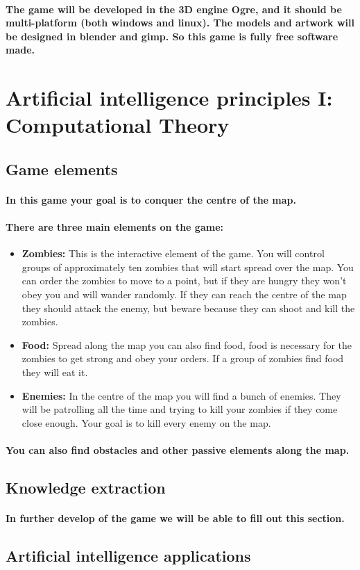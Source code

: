 \documentclass[a4paper,10pt]{article}
\newcommand{\p}[1]{\paragraph{\indent\textnormal{#1}}}
\begin{document}
    \p{The game will be developed in the 3D engine  Ogre, and it should be multi-platform (both windows and linux). The models and artwork will be designed in blender and gimp. So this game is fully free software made.}
    

\newpage
\section{Artificial intelligence principles I: Computational Theory}

  \subsection{Game elements}

    \p{In this game your goal is to conquer the centre of the map.}

    \p{There are three main elements on the game:}

    \begin{itemize}
     \item \textbf{Zombies:} This is the interactive element of the game. You will control groups of approximately ten zombies that will start spread over the map. You can order the zombies to move to a point, but if they are hungry they won't obey you and will wander randomly. If they can reach the centre of the map they should attack the enemy, but beware because they can shoot and kill the zombies.
     \item \textbf{Food:} Spread along the map you can also find food, food is necessary for the zombies to get strong and obey your orders. If a group of zombies find food they will eat it.
     \item \textbf{Enemies:} In the centre of the map you will find a bunch of enemies. They will be patrolling all the time and trying to kill your zombies if they come close enough. Your goal is to kill every enemy on the map.
    \end{itemize}

  \p{You can also find obstacles and other passive elements along the map.}


  \subsection{Knowledge extraction}

    \p{In further develop of the game we will be able to fill out this section.}

  \subsection{Artificial intelligence applications}
\end{document}
